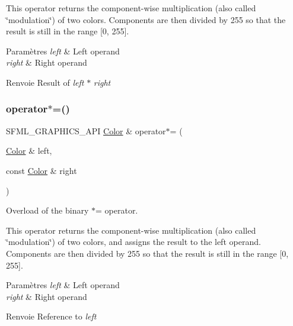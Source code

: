 This operator returns the component-\/wise multiplication (also called \char`\"{}modulation\char`\"{}) of two colors. Components are then divided by 255 so that the result is still in the range \mbox{[}0, 255\mbox{]}.


\begin{DoxyParams}{Paramètres}
{\em left} & Left operand \\
\hline
{\em right} & Right operand\\
\hline
\end{DoxyParams}
\begin{DoxyReturn}{Renvoie}
Result of {\itshape left} $\ast$ {\itshape right} 
\end{DoxyReturn}
\mbox{\label{classsf_1_1Color_a8953be58a47ced92fb25966d6ee90511}} 
\subsubsection{\texorpdfstring{operator$\ast$=()}{operator*=()}}
{\footnotesize\ttfamily S\+F\+M\+L\+\_\+\+G\+R\+A\+P\+H\+I\+C\+S\+\_\+\+A\+PI \hyperlink{classsf_1_1Color}{Color} \& operator$\ast$= (\begin{DoxyParamCaption}\item[{\hyperlink{classsf_1_1Color}{Color} \&}]{left,  }\item[{const \hyperlink{classsf_1_1Color}{Color} \&}]{right }\end{DoxyParamCaption})\hspace{0.3cm}{\ttfamily [related]}}



Overload of the binary $\ast$= operator. 

This operator returns the component-\/wise multiplication (also called \char`\"{}modulation\char`\"{}) of two colors, and assigns the result to the left operand. Components are then divided by 255 so that the result is still in the range \mbox{[}0, 255\mbox{]}.


\begin{DoxyParams}{Paramètres}
{\em left} & Left operand \\
\hline
{\em right} & Right operand\\
\hline
\end{DoxyParams}
\begin{DoxyReturn}{Renvoie}
Reference to {\itshape left} 
\end{DoxyReturn}
\mbox{\label{classsf_1_1Color_a90e79ecc276114cda519a88119ac645b}} 
